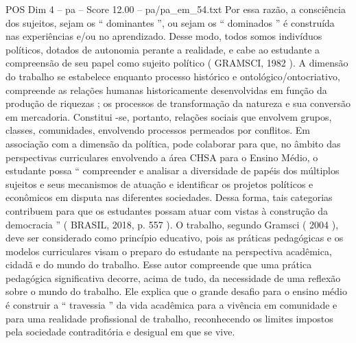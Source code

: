 \begin{textsample}{POS Dim 4 – pa – Score 12.00 – pa/pa\_em\_54.txt}
Por essa razão, a consciência dos sujeitos, sejam os “ dominantes ”, ou sejam os “ dominados ” é construída nas experiências e/ou no aprendizado.
Desse modo, todos somos indivíduos políticos, dotados de autonomia perante a realidade, e cabe ao estudante a compreensão de seu papel como sujeito político ( GRAMSCI, 1982 ).
A dimensão do trabalho se estabelece enquanto processo histórico e ontológico/ontocriativo, compreende as relações humanas historicamente desenvolvidas em função da produção de riquezas ; os processos de transformação da natureza e sua conversão em mercadoria.
Constitui -se, portanto, relações sociais que envolvem grupos, classes, comunidades, envolvendo processos permeados por conflitos.
Em associação com a dimensão da política, pode colaborar para que, no âmbito das perspectivas curriculares envolvendo a área CHSA para o Ensino Médio, o estudante possa “ compreender e analisar a diversidade de papéis dos múltiplos sujeitos e seus mecanismos de atuação e identificar os projetos políticos e econômicos em disputa nas diferentes sociedades.
Dessa forma, tais categorias contribuem para que os estudantes possam atuar com vistas à construção da democracia ” ( BRASIL, 2018, p. 557 ).
O trabalho, segundo Gramsci ( 2004 ), deve ser considerado como princípio educativo, pois as práticas pedagógicas e os modelos curriculares visam o preparo do estudante na perspectiva acadêmica, cidadã e do mundo do trabalho.
Esse autor compreende que uma prática pedagógica significativa decorre, acima de tudo, da necessidade de uma reflexão sobre o mundo do trabalho.
Ele explica que o grande desafio para o ensino médio é construir a “ travessia ” da vida acadêmica para a vivência em comunidade e para uma realidade profissional de trabalho, reconhecendo os limites impostos pela sociedade contraditória e desigual em que se vive.

\end{textsample}
